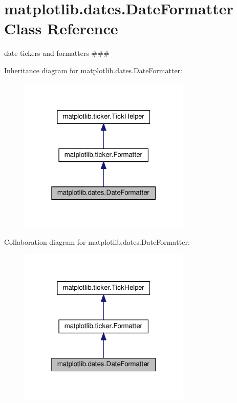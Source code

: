 \hypertarget{classmatplotlib_1_1dates_1_1DateFormatter}{}\section{matplotlib.\+dates.\+Date\+Formatter Class Reference}
\label{classmatplotlib_1_1dates_1_1DateFormatter}


date tickers and formatters \#\#\#  




Inheritance diagram for matplotlib.\+dates.\+Date\+Formatter\+:
\nopagebreak
\begin{figure}[H]
\begin{center}
\leavevmode
\includegraphics[width=232pt]{classmatplotlib_1_1dates_1_1DateFormatter__inherit__graph}
\end{center}
\end{figure}


Collaboration diagram for matplotlib.\+dates.\+Date\+Formatter\+:
\nopagebreak
\begin{figure}[H]
\begin{center}
\leavevmode
\includegraphics[width=232pt]{classmatplotlib_1_1dates_1_1DateFormatter__coll__graph}
\end{center}
\end{figure}
